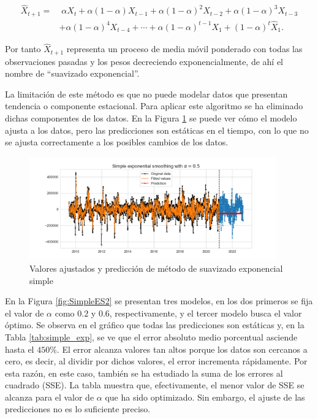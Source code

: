 \documentclass[12pt,twoside]{article}
\begin{document}
\begin{equation*}
\begin{split}
    \hat{X}_{t+1} = &\; \alpha X_t + \alpha(1-\alpha)X_{t-1} + \alpha(1-\alpha)^2X_{t-2} + \alpha(1-\alpha)^3X_{t-3} \\
    & + \alpha(1-\alpha)^4X_{t-4} + \dotsb +  \alpha(1-\alpha)^{t-1}X_1 + (1-\alpha)^t\hat{X}_1.
\end{split}
\end{equation*}

Por tanto $\hat{X}_{t+1}$ representa un proceso de media móvil ponderado con todas las observaciones pasadas y los pesos decreciendo exponencialmente, de ahí el nombre de ``suavizado exponencial''.

La limitación de este método es que no puede modelar datos que presentan tendencia o componente estacional. Para aplicar este algoritmo se ha eliminado dichas componentes de los datos. En  la Figura \ref{fig:SimpleES1} se puede ver cómo el modelo ajusta a los datos, pero las predicciones son estáticas en el tiempo, con lo que no se ajusta correctamente a los posibles cambios de los datos.

\begin{figure}[h]
    \centering
    \includegraphics[width = 0.95\textwidth]{imagenes/SimpleES1.png}
    \caption{Valores ajustados y predicción de método de suavizado exponencial simple}\label{fig:SimpleES1}
\end{figure}


En la Figura \ref{fig:SimpleES2} se presentan tres modelos, en los dos primeros se fija el valor de $\alpha$ como $0.2$ y $0.6$, respectivamente, y el tercer modelo busca el valor óptimo. Se observa en el gráfico que todas las predicciones son estáticas y, en la Tabla \ref{tab:simple_exp}, se ve que el error absoluto medio porcentual asciende hasta el $450\%$. El error alcanza valores tan altos porque los datos son cercanos a cero, es decir, al dividir por dichos valores, el error incrementa rápidamente. Por esta razón, en este caso, también se ha estudiado la suma de los errores al cuadrado (SSE). La tabla muestra que, efectivamente, el menor valor de SSE se alcanza para el valor de $\alpha$ que ha sido optimizado. Sin embargo, el ajuste de las predicciones no es lo suficiente preciso.
\end{document}
